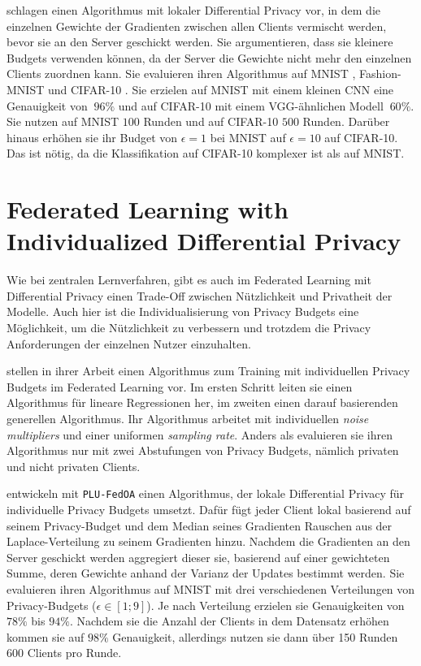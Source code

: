 \textcite{sun:2021} schlagen einen Algorithmus mit lokaler Differential Privacy vor, in dem die einzelnen Gewichte der Gradienten zwischen allen Clients vermischt werden, bevor sie an den Server geschickt werden. Sie argumentieren, dass sie kleinere Budgets verwenden können, da der Server die Gewichte nicht mehr den einzelnen Clients zuordnen kann. Sie evaluieren ihren Algorithmus auf MNIST \cite{lecun:1998}, Fashion-MNIST \cite{xiao:2017} und CIFAR-10 \cite{krizhevsky:2009}. Sie erzielen auf MNIST mit einem kleinen CNN eine Genauigkeit von $~96\%$ und auf CIFAR-10 mit einem VGG-ähnlichen Modell $~60\%$. Sie nutzen auf MNIST $100$ Runden und auf CIFAR-10 $500$ Runden. Darüber hinaus erhöhen sie ihr Budget von $\epsilon = 1$ bei MNIST auf $\epsilon = 10$ auf CIFAR-10. Das ist nötig, da die Klassifikation auf CIFAR-10 komplexer ist als auf MNIST.


\section{Federated Learning with Individualized Differential Privacy}\label{sec:rw-flidp}

Wie bei zentralen Lernverfahren, gibt es auch im Federated Learning mit Differential Privacy einen Trade-Off zwischen Nützlichkeit und Privatheit der Modelle. Auch hier ist die Individualisierung von Privacy Budgets eine Möglichkeit, um die Nützlichkeit zu verbessern und trotzdem die Privacy Anforderungen der einzelnen Nutzer einzuhalten.

\textcite{aldaghri:2023} stellen in ihrer Arbeit einen Algorithmus zum Training mit individuellen Privacy Budgets im Federated Learning vor. Im ersten Schritt leiten sie einen Algorithmus für lineare Regressionen her, im zweiten einen darauf basierenden generellen Algorithmus. Ihr Algorithmus arbeitet mit individuellen \textit{noise multipliers} und einer uniformen \textit{sampling rate}. Anders als \citeauthor{boenisch:2023} evaluieren sie ihren Algorithmus nur mit zwei Abstufungen von Privacy Budgets, nämlich privaten und nicht privaten Clients.

\textcite{yang:2021} entwickeln mit \texttt{PLU-FedOA} einen Algorithmus, der lokale Differential Privacy für individuelle Privacy Budgets umsetzt. Dafür fügt jeder Client lokal basierend auf seinem Privacy-Budget und dem Median seines Gradienten Rauschen aus der Laplace-Verteilung zu seinem Gradienten hinzu. Nachdem die Gradienten an den Server geschickt werden aggregiert dieser sie, basierend auf einer gewichteten Summe, deren Gewichte anhand der Varianz der Updates bestimmt werden. Sie evaluieren ihren Algorithmus auf MNIST mit drei verschiedenen Verteilungen von Privacy-Budgets ($\epsilon \in [1;9]$). Je nach Verteilung erzielen sie Genauigkeiten von $78\%$ bis $94\%$. Nachdem sie die Anzahl der Clients in dem Datensatz erhöhen kommen sie auf $98\%$ Genauigkeit, allerdings nutzen sie dann über 150 Runden 600 Clients pro Runde.

